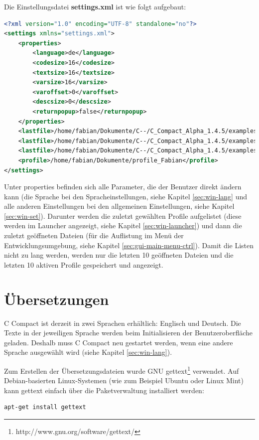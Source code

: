 Die Einstellungsdatei \textbf{settings.xml} ist wie folgt aufgebaut:
\begin{lstlisting}[language=XML]
<?xml version="1.0" encoding="UTF-8" standalone="no"?>
<settings xmlns="settings.xml">
	<properties>
		<language>de</language>
		<codesize>16</codesize>
		<textsize>16</textsize>
		<varsize>16</varsize>
		<varoffset>0</varoffset>
		<descsize>0</descsize>
		<returnpopup>false</returnpopup>
	</properties>
	<lastfile>/home/fabian/Dokumente/C--/C_Compact_Alpha_1.4.5/examples/helloworld/helloworld.cmm</lastfile>
	<lastfile>/home/fabian/Dokumente/C--/C_Compact_Alpha_1.4.5/examples/random/random.cmm</lastfile>
	<lastfile>/home/fabian/Dokumente/C--/C_Compact_Alpha_1.4.5/examples/bubblesort/bubblesort.cmm</lastfile>
	<profile>/home/fabian/Dokumente/profile_Fabian</profile>
</settings>
\end{lstlisting}

Unter \glqq{}properties\grqq{} befinden sich alle Parameter, die der Benutzer direkt ändern kann (die Sprache bei den Spracheinstellungen, siehe Kapitel \ref{sec:win-lang} und alle anderen Einstellungen bei den allgemeinen Einstellungen, siehe Kapitel \ref{sec:win-set}). Darunter werden die zuletzt gewählten Profile aufgelistet (diese werden im Launcher angezeigt, siehe Kapitel \ref{sec:win-launcher}) und dann die zuletzt geöffneten Dateien (für die Auflistung im Menü der Entwicklungsumgebung, siehe Kapitel \ref{sec:gui-main-menu-ctrl}). Damit die Listen nicht zu lang werden, werden nur die letzten 10 geöffneten Dateien und die letzten 10 aktiven Profile gespeichert und angezeigt.

\section{Übersetzungen}
\label{sec:lang}
C Compact ist derzeit in zwei Sprachen erhältlich: Englisch und Deutsch. Die Texte in der jeweiligen Sprache werden beim Initialisieren der Benutzeroberfläche geladen. Deshalb muss C Compact neu gestartet werden, wenn eine andere Sprache ausgewählt wird (siehe Kapitel \ref{sec:win-lang}).

Zum Erstellen der Übersetzungsdateien wurde GNU gettext\footnote{http://www.gnu.org/software/gettext/} verwendet. Auf Debian-basierten Linux-Systemen (wie zum Beispiel Ubuntu oder Linux Mint) kann gettext einfach über die Paketverwaltung installiert werden:
\begin{lstlisting}[language=sh]
apt-get install gettext
\end{lstlisting}

